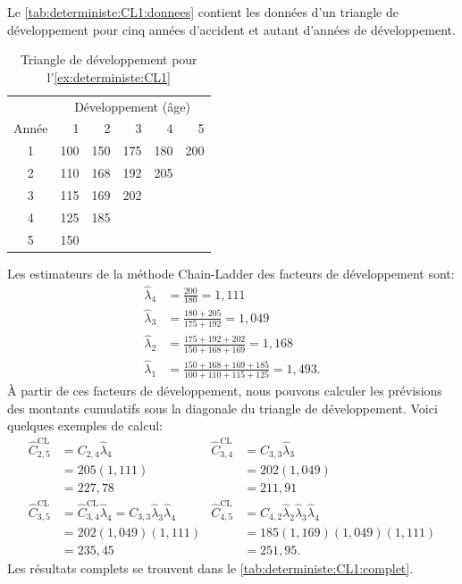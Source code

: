 \begin{exemple}
  \label{ex:deterministe:CL1}
  Le \autoref{tab:deterministe:CL1:donnees} contient les données d'un
  triangle de développement pour cinq années d'accident et autant
  d'années de développement.

  \begin{table}
    \centering
    \caption{Triangle de développement pour
      l'\autoref{ex:deterministe:CL1}}
    \label{tab:deterministe:CL1:donnees}
    \begin{tabular}{crrrrr}
      \toprule
      & \multicolumn{5}{c}{Développement (âge)} \\
      Année & 1 & 2 & 3 & 4 & 5 \\
      \midrule
      1 & 100 & 150 & 175 & 180 & 200 \\
      2 & 110 & 168 & 192 & 205 \\
      3 & 115 & 169 & 202 \\
      4 & 125 & 185 \\
      5 & 150 \\
      \bottomrule
    \end{tabular}
  \end{table}

  Les estimateurs de la méthode Chain-Ladder des facteurs de
  développement sont:
  \begin{align*}
    \hat{\lambda}_4 &= \frac{200}{180} = 1,111 \\
    \hat{\lambda}_3 &= \frac{180+205}{175+192} = 1,049 \\
    \hat{\lambda}_2 &= \frac{175+192+202}{150+168+169} = 1,168 \\
    \hat{\lambda}_1 &= \frac{150+168+169+185}{100+110+115+125} = 1,493.
  \end{align*}
  À partir de ces facteurs de développement, nous pouvons calculer les
  prévisions des montants cumulatifs sous la diagonale du triangle de
  développement. Voici quelques exemples de calcul:
  \begin{align*}
    \hat{C}_{2,5}^{\text{CL}}
    &= C_{2, 4} \hat{\lambda}_4 &
    \hat{C}_{3,4}^{\text{CL}}
    &= C_{3, 3} \hat{\lambda}_3 \\
    &= 205 (1,111) &
    &= 202 (1,049) \\
    &= 227,78 &
    &= 211,91 \\
    \hat{C}_{3,5}^{\text{CL}}
    &= \hat{C}_{3, 4}^{\text{CL}} \hat{\lambda}_4 = C_{3, 3} \hat{\lambda}_3 \hat{\lambda}_4 &
    \hat{C}_{4,5}^{\text{CL}}
    &= C_{4, 2} \hat{\lambda}_2 \hat{\lambda}_3 \hat{\lambda}_4 \\
    &= 202 (1,049)(1,111) &
    &= 185 (1,169)(1,049)(1,111) \\
    &= 235,45 &
    &= 251,95.
  \end{align*}
  Les résultats complets se trouvent dans le
  \autoref{tab:deterministe:CL1:complet}.


\end{exemple}
